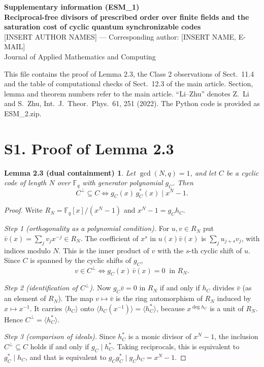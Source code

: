 \documentclass[11pt,a4paper]{article}
\newtheorem*{lem}{Lemma 2.3 (dual containment)}
\begin{document}
\begin{center}
{\large\bfseries Supplementary information (ESM\_1)}\\[4pt]
{\bfseries Reciprocal-free divisors of prescribed order over finite fields and the saturation cost of cyclic quantum synchronizable codes}\\[4pt]
[INSERT AUTHOR NAMES] --- Corresponding author: [INSERT NAME, E-MAIL]\\[2pt]
Journal of Applied Mathematics and Computing
\end{center}

\noindent This file contains the proof of Lemma 2.3, the Class 2 observations of Sect.~11.4 and the table of computational checks of Sect.~12.3 of the main article. Section, lemma and theorem numbers refer to the main article. ``Li--Zhu'' denotes Z.~Li and S.~Zhu, Int.\ J.\ Theor.\ Phys.\ 61, 251 (2022). The Python code is provided as ESM\_2.zip.

\section*{S1. Proof of Lemma 2.3}

\begin{lem}
Let $\gcd(N,q)=1$, and let $C$ be a cyclic code of length $N$ over $\mathbb F_q$ with generator polynomial $g_C$. Then
\[
C^{\perp}\subseteq C\iff g_C(x)\,g_C^{*}(x)\mid x^N-1 .
\]
\end{lem}

\begin{proof}
Write $R_N=\mathbb F_q[x]/(x^N-1)$ and $x^N-1=g_Ch_C$.

\emph{Step 1 (orthogonality as a polynomial condition).} For $u,v\in R_N$ put $\bar v(x)=\sum_j v_jx^{-j}\in R_N$. The coefficient of $x^{s}$ in $u(x)\bar v(x)$ is $\sum_j u_{j+s}v_j$, with indices modulo $N$. This is the inner product of $v$ with the $s$-th cyclic shift of $u$. Since $C$ is spanned by the cyclic shifts of $g_C$,
\[
v\in C^{\perp}\iff g_C(x)\,\bar v(x)=0\ \text{ in } R_N .
\]

\emph{Step 2 (identification of $C^{\perp}$).} Now $g_C\bar v=0$ in $R_N$ if and only if $h_C$ divides $\bar v$ (as an element of $R_N$). The map $v\mapsto\bar v$ is the ring automorphism of $R_N$ induced by $x\mapsto x^{-1}$. It carries $\langle h_C\rangle$ onto $\langle h_C(x^{-1})\rangle=\langle h_C^{*}\rangle$, because $x^{\deg h_C}$ is a unit of $R_N$. Hence $C^{\perp}=\langle h_C^{*}\rangle$.

\emph{Step 3 (comparison of ideals).} Since $h_C^{*}$ is a monic divisor of $x^N-1$, the inclusion $C^{\perp}\subseteq C$ holds if and only if $g_C\mid h_C^{*}$. Taking reciprocals, this is equivalent to $g_C^{*}\mid h_C$, and that is equivalent to $g_Cg_C^{*}\mid g_Ch_C=x^N-1$.
\end{proof}
\end{document}
